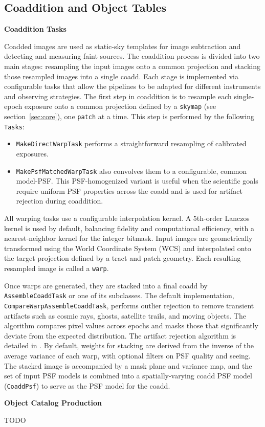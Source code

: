 \subsection{Coaddition and Object Tables}

\textbf{Coaddition Tasks}
\label{sec:coaddition}

Coadded images are used as static-sky templates for image subtraction and detecting and measuring faint sources.
The coaddition process is divided into two main stages: resampling the input images onto a common projection and stacking those resampled images into a single coadd.
Each stage is implemented via configurable tasks that allow the pipelines to be adapted for different instruments and observing strategies.
The first step in coaddition is to resample each single-epoch exposure onto a common projection defined by a \texttt{skymap} (see section~\ref{sec:core}), one \texttt{patch} at a time.
This step is performed by the following \texttt{Tasks}:
\begin{itemize}
\item \texttt{MakeDirectWarpTask} performs a straightforward resampling of calibrated exposures.
 \item \texttt{MakePsfMatchedWarpTask} also convolves them to a configurable, common model-PSF.
 This PSF-homogenized variant is useful when the scientific goals require uniform PSF properties across the coadd and is used for artifact rejection during coaddition.
 \end{itemize}

All warping tasks use a configurable interpolation kernel. A 5th-order Lanczos kernel is used by default, balancing fidelity and computational efficiency, with a nearest-neighbor kernel for the integer bitmask.
Input images are geometrically transformed using the World Coordinate System (WCS) and interpolated onto the target projection defined by a tract and patch geometry.
Each resulting resampled image is called a \texttt{warp}.

Once warps are generated, they are stacked into a final coadd by \texttt{AssembleCoaddTask} or one of its subclasses.
The default implementation, \texttt{CompareWarpAssembleCoaddTask}, performs outlier rejection to remove transient artifacts such as cosmic rays, ghosts, satellite trails, and moving objects.
The algorithm compares pixel values across epochs and masks those that significantly deviate from the expected distribution.
The artifact rejection algorithm is detailed in \citet{DMTN-080}.
By default, weights for stacking are derived from the inverse of the average variance of each warp, with optional filters on PSF quality and seeing.
The stacked image is accompanied by a mask plane and variance map, and the set of input PSF models is combined into a spatially-varying coadd PSF model (\texttt{CoaddPsf}) to serve as the PSF model for the coadd.

\textbf{Object Catalog Production}

TODO
